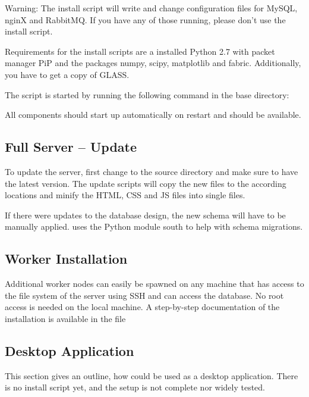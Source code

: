 Warning: The install script will write and change configuration files for MySQL, nginX and RabbitMQ.
If you have any of those running, please don't use the install script.

Requirements for the install scripts are a installed Python 2.7 with packet manager PiP and the packages numpy, scipy, matplotlib and fabric.
Additionally, you have to get a copy of GLASS.

The script is started by running the following command in the base directory:

All components should start up automatically on restart and \spl should be available.


\subsection{Full Server -- Update}

To update the server, first change to the source directory and make sure to have the latest version.
The update scripts will copy the new files to the according locations and minify the HTML, CSS and JS files into single files.

If there were updates to the database design, the new schema will have to be manually applied.
\spl uses the Python module south to help with schema migrations.


\subsection{Worker Installation}
\label{sec:workerinstall}

Additional worker nodes can easily be spawned on any machine that has access to the file system of the server using SSH and can access the database.
No root access is needed on the local machine.
A step-by-step documentation of the installation is available in the file 



\subsection{Desktop Application}

This section gives an outline, how \spl could be used as a desktop application.
There is no install script yet, and the setup is not complete nor widely tested.

